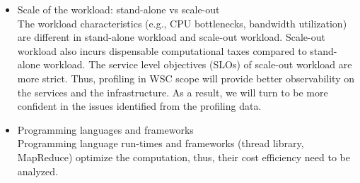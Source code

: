 \begin{itemize}
  \item Scale of the workload: stand-alone vs scale-out \autocite{DBLP:conf/asplos/FerdmanAKVAJKPAF12} \\
    The workload characteristics (e.g., CPU bottlenecks, bandwidth utilization) are different in stand-alone workload and scale-out workload. Scale-out workload also incurs dispensable computational taxes compared to stand-alone workload. The service level objectives (SLOs) of scale-out workload are more strict. Thus, profiling in WSC scope will provide better observability on the services and the infrastructure. As a result, we will turn to be more confident in the issues identified from the profiling data.
  \item Programming languages and frameworks \autocite{DBLP:conf/asplos/FerdmanAKVAJKPAF12, DBLP:conf/iwqos/GuoCWDFMB19} \\
    Programming language run-times and frameworks (thread library, MapReduce) optimize the computation, thus, their cost efficiency need to be analyzed.


\end{itemize}
